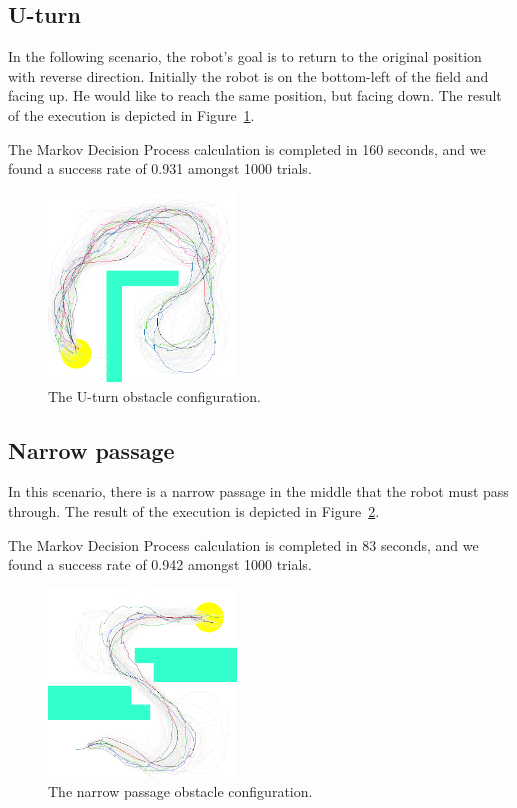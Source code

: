 \documentclass[10pt,a4paper,oneside]{article}
\begin{document}
\subsection{U-turn}

In the following scenario, the robot's goal is to return to the original position
with reverse direction. Initially the robot is on the bottom-left of the field
and facing up. He would like to reach the same position, but facing down.
The result of the execution is depicted in Figure~\ref{f:uturn}.

The Markov Decision Process calculation is completed in 160 seconds,
and we found a success rate of 0.931 amongst 1000 trials.

\begin{figure}
\centerline{\includegraphics[width=5cm]{figures/uturn.png}}
\caption{The U-turn obstacle configuration.}
\label{f:uturn}
\end{figure}

\subsection{Narrow passage}

In this scenario, there is a narrow passage in the middle that the robot
must pass through.
The result of the execution is depicted in Figure~\ref{f:narrow}.

The Markov Decision Process calculation is completed in 83 seconds,
and we found a success rate of 0.942 amongst 1000 trials.

\begin{figure}
\centerline{\includegraphics[width=5cm]{figures/narrow.png}}
\caption{The narrow passage obstacle configuration.}
\label{f:narrow}
\end{figure}
\end{document}

